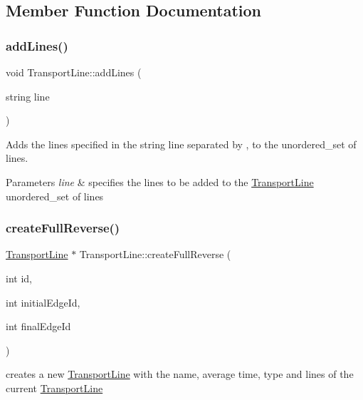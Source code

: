 \subsection{Member Function Documentation}
\mbox{\label{class_transport_line_aca504818880b0738c8533dda5482d25a}} 
\subsubsection{\texorpdfstring{add\+Lines()}{addLines()}}
{\footnotesize\ttfamily void Transport\+Line\+::add\+Lines (\begin{DoxyParamCaption}\item[{string}]{line }\end{DoxyParamCaption})}



Adds the lines specified in the string line separated by \textquotesingle{},\textquotesingle{} to the unordered\+\_\+set of lines. 


\begin{DoxyParams}{Parameters}
{\em line} & specifies the lines to be added to the \hyperlink{class_transport_line}{Transport\+Line} unordered\+\_\+set of lines \\
\hline
\end{DoxyParams}
\mbox{\label{class_transport_line_ac326e35335fd7e50661a62511b5364f4}} 
\subsubsection{\texorpdfstring{create\+Full\+Reverse()}{createFullReverse()}}
{\footnotesize\ttfamily \hyperlink{class_transport_line}{Transport\+Line} $\ast$ Transport\+Line\+::create\+Full\+Reverse (\begin{DoxyParamCaption}\item[{int}]{id,  }\item[{int}]{initial\+Edge\+Id,  }\item[{int}]{final\+Edge\+Id }\end{DoxyParamCaption})}



creates a new \hyperlink{class_transport_line}{Transport\+Line} with the name, average time, type and lines of the current \hyperlink{class_transport_line}{Transport\+Line} 


